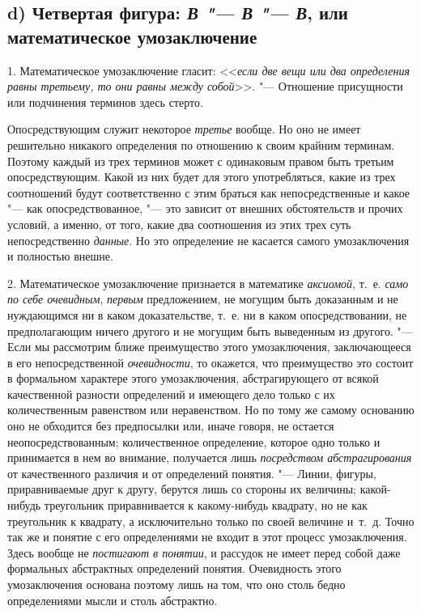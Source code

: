 {{\subsection[d) Четвертая фигура]
{d) Четвертая фигура: {\em В "--- В "--- В}, или математическое умозаключение}
\label{bkm:bm110a}
1. Математическое умозаключение гласит:
<<{\em если две вещи или два определения
равны третьему, то они равны между собой}>>. "--- Отношение
присущности или подчинения терминов здесь стерто.

Опосредствующим служит некоторое
{\em третье} вообще. Но
оно не имеет решительно никакого определения по отношению к своим крайним
терминам. Поэтому каждый из трех терминов может с одинаковым правом быть
третьим опосредствующим. Какой из них будет для этого употребляться, какие
из трех соотношений будут соответственно с этим браться как
непосредственные и какое "--- как опосредствованное, "---
это зависит от внешних обстоятельств и прочих условий, а
именно, от того, какие два соотношения из этих трех суть непосредственно
{\em данные}. Но это
определение не касается самого умозаключения и полностью внешне.

2. Математическое умозаключение признается в математике
{\em аксиомой}, т.~е.
{\em само по себе очевидным},
{\em первым} предложением,
не могущим быть доказанным и не нуждающимся ни в каком доказательстве,
т.~е. ни в каком опосредствовании, не предполагающим ничего другого и не
могущим быть выведенным из другого. "--- Если мы рассмотрим
ближе преимущество этого умозаключения, заключающееся в его
непосредственной {\em очевидности},
то окажется, что преимущество это состоит в формальном
характере этого умозаключения, абстрагирующего от всякой качественной
разности определений и имеющего дело только с их количественным равенством
или неравенством. Но по тому же самому основанию оно не обходится без
предпосылки или, иначе говоря, не остается неопосредствованным;
количественное определение, которое одно только и принимается в нем во
внимание, получается лишь
{\em посредством абстрагирования}
от качественного различия и от определений понятия. "---
Линии, фигуры, приравниваемые друг к другу, берутся лишь со
стороны их величины; какой-нибудь треугольник приравнивается к
какому-нибудь квадрату, но не как треугольник к квадрату, а исключительно
только по своей величине и~т.~д. Точно так же и понятие с его определениями
не входит в этот процесс умозаключения. Здесь вообще не
{\em постигают в понятии},
и рассудок не имеет перед собой даже формальных абстрактных
определений понятия. Очевидность этого умозаключения основана поэтому лишь
на том, что оно столь бедно определениями мысли и столь абстрактно.

}}

